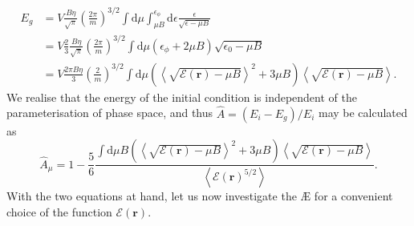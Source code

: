 \begin{equation}
\begin{aligned}
    E_g &= V \frac{B \eta}{\sqrt{\pi}} \left(\frac{2 \pi}{m}\right)^{3/2} \int \mathrm{d}\mu \int_{\mu B}^{\epsilon_\phi}\mathrm{d}\epsilon \frac{ \epsilon}{ \sqrt{\epsilon - \mu B}}  \\ 
    &= V \frac{2}{3}  \frac{B\eta}{\sqrt{\pi}} \left(\frac{2 \pi}{m}\right)^{3/2} \int \mathrm{d}\mu (\epsilon_\phi + 2 \mu B) \sqrt{\epsilon_0 - \mu B} \\
    &= V \frac{2\pi B\eta}{3}  \left(\frac{2 }{m}\right)^{3/2} \int \mathrm{d}\mu \left(\left\langle \sqrt{ \mathcal{E}(\boldsymbol{r}) - \mu B} \right\rangle^2 + 3 \mu B \right) \left\langle \sqrt{ \mathcal{E}(\boldsymbol{r}) - \mu B} \right\rangle.
\end{aligned}
\end{equation}
We realise that the energy of the initial condition is independent of the parameterisation of phase space, and thus $\widehat{A}=(E_i -E_g)/E_i$ may be calculated as
\begin{equation}
    \widehat{A}_\mu = 1 - \frac{ 5 }{6}\frac{ \int \mathrm{d}\mu B \left(\left\langle \sqrt{ \mathcal{E}(\boldsymbol{r}) - \mu B} \right\rangle^2 + 3 \mu B \right) \left\langle \sqrt{ \mathcal{E}(\boldsymbol{r}) - \mu B} \right\rangle}{\left\langle \mathcal{E}(\boldsymbol{r})^{5/2} \right\rangle}.
    \label{eq: ae constraints}
\end{equation}
With the two equations at hand, let us now investigate the \AE{} for a convenient choice of the function $\mathcal{E}(\boldsymbol{r})$.
